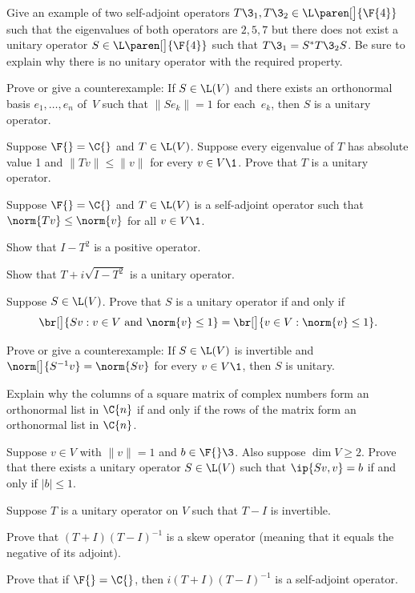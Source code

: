 \exercise
Give an example of two self-adjoint operators $T\3_1, T\3_2 \in \L\paren[\big]{\F{4}}$ such that the eigenvalues of both operators are $2, 5, 7$ but there does not exist a unitary operator $S\in \L\paren[\big]{\F{4}}$ such that
$T\3_1 = S^* T\3_2 S$.
Be sure to explain why there is no unitary operator with the required property.


\exercise
Prove or give a counterexample: If $S \in \L(V)$ and there exists an orthonormal basis $e_1, \dots, e_n$ of~$V$ such that $\|Se_k\| = 1$ for each~$e_k$, then $S$ is a unitary operator.


\exercise
Suppose $\F{} = \C{}$ and $T \in \L(V)$. Suppose every eigenvalue of $T$ has absolute value 1 and
$\|Tv\| \le \|v\|$ for every $v \in V\1$. Prove that $T$ is a unitary operator.


\exercise
Suppose $\F{} = \C{}$ and $T \in \L(V)$ is a self-adjoint operator such that $\norm{Tv} \le \norm{v}$ for all $v \in V\1$.
\begin{subtheorem}
\item
Show that $I - T^2$ is a positive operator.
\item
Show that $T + i \sqrt{I - T^2}$ is a unitary operator.
\end{subtheorem}
\exercisesubtheoremend


\exercise
Suppose $S \in \L(V)$. Prove that $S$ is a unitary operator if and only if \label{IsoBall}
\[
\br[\big]{ Sv : v \in V \text{ and } \norm{v} \le 1} = \br[\big]{ v \in V: \norm{v} \le 1}.
\]
\exercisedisplayend


\exercise
Prove or give a counterexample: If $S \in \L(V)$ is invertible and \mbox{$\norm[\big]{S^{-1} v} =  \norm{S v}$} for every $v \in V\1$, then $S$ is unitary.


\pagebreak[3]

\exercise
Explain why the columns of a square matrix of complex numbers form an orthonormal list in $\C{n}$ if and only if the rows of the matrix form an orthonormal list in $\C{n}$.


\exercise
Suppose $v \in V$ with $\|v\| = 1$ and $b \in \F{}\3$. Also suppose $\dim V \ge 2$. Prove that there exists a unitary operator $S \in \L(V)$ such that $\ip{Sv, v} = b$ if and only if $|b| \le 1$.


\exercise
Suppose $T$ is a unitary operator on $V$ such that $T - I$ is invertible. \label{4UnitCircle}
\begin{subtheorem}
\item
Prove that $(T + I)(T - I)^{-1}$ is a skew operator (meaning that it equals the negative of its adjoint).
\item
Prove that if $\F{} = \C{}$, then $i (T + I)(T - I)^{-1}$ is a self-adjoint operator.
\end{subtheorem}


